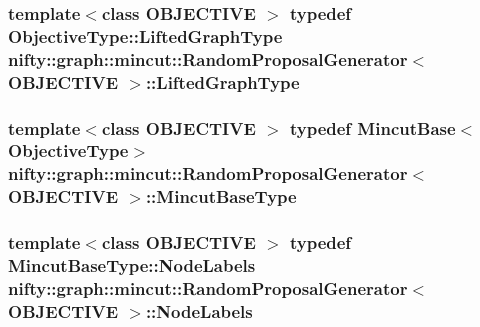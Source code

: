 \subsubsection[{Lifted\+Graph\+Type}]{\setlength{\rightskip}{0pt plus 5cm}template$<$class O\+B\+J\+E\+C\+T\+I\+V\+E $>$ typedef Objective\+Type\+::\+Lifted\+Graph\+Type {\bf nifty\+::graph\+::mincut\+::\+Random\+Proposal\+Generator}$<$ O\+B\+J\+E\+C\+T\+I\+V\+E $>$\+::{\bf Lifted\+Graph\+Type}}\label{classnifty_1_1graph_1_1mincut_1_1RandomProposalGenerator_adbe69cbb29d33d9e650a7f1c12cc5c32}
\hypertarget{classnifty_1_1graph_1_1mincut_1_1RandomProposalGenerator_a3b175c7a1e8c0cf1261ff898cb7e0c50}{}
\subsubsection[{Mincut\+Base\+Type}]{\setlength{\rightskip}{0pt plus 5cm}template$<$class O\+B\+J\+E\+C\+T\+I\+V\+E $>$ typedef {\bf Mincut\+Base}$<${\bf Objective\+Type}$>$ {\bf nifty\+::graph\+::mincut\+::\+Random\+Proposal\+Generator}$<$ O\+B\+J\+E\+C\+T\+I\+V\+E $>$\+::{\bf Mincut\+Base\+Type}}\label{classnifty_1_1graph_1_1mincut_1_1RandomProposalGenerator_a3b175c7a1e8c0cf1261ff898cb7e0c50}
\hypertarget{classnifty_1_1graph_1_1mincut_1_1RandomProposalGenerator_a52bd50ecf7237628151816d85004bad9}{}
\subsubsection[{Node\+Labels}]{\setlength{\rightskip}{0pt plus 5cm}template$<$class O\+B\+J\+E\+C\+T\+I\+V\+E $>$ typedef {\bf Mincut\+Base\+Type\+::\+Node\+Labels} {\bf nifty\+::graph\+::mincut\+::\+Random\+Proposal\+Generator}$<$ O\+B\+J\+E\+C\+T\+I\+V\+E $>$\+::{\bf Node\+Labels}}\label{classnifty_1_1graph_1_1mincut_1_1RandomProposalGenerator_a52bd50ecf7237628151816d85004bad9}
\hypertarget{classnifty_1_1graph_1_1mincut_1_1RandomProposalGenerator_a335a453972c8a979d8816ba411fdac6d}{}
